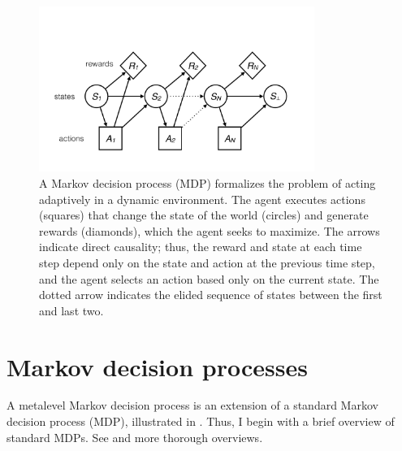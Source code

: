 

\begin{figure}
  \centering
  \includegraphics[width=0.8\textwidth,page=1,trim=0 100 0 200]{diagrams/metamdp.pdf}
  \caption{
    A Markov decision process (MDP) formalizes the problem of acting adaptively in a dynamic environment. The agent executes actions (squares) that change the state of the world (circles) and generate rewards (diamonds), which the agent seeks to maximize. The arrows indicate direct causality; thus, the reward and state at each time step depend only on the state and action at the previous time step, and the agent selects an action based only on the current state. The dotted arrow indicates the elided sequence of states between the first and last two.
  }
  \label{fig:mdp-diagram}
\end{figure}


\section{Markov decision processes}

A metalevel Markov decision process is an extension of a standard Markov decision process (MDP), illustrated in . Thus, I begin with a brief overview of standard MDPs. See \citet{puterman2014markov} and \citet{sutton2018reinforcement} more thorough overviews.

